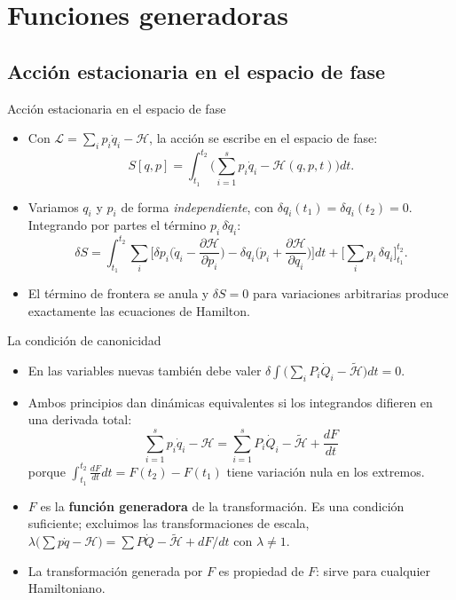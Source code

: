 \documentclass[spanish]{beamer}
\newcommand{\Lag}{\mathcal{L}}               %
\newcommand{\Ham}{\mathcal{H}}               %
\newcommand{\tH}{\tilde{\mathcal{H}}}        %
\newcommand{\pd}[2]{\frac{\partial #1}{\partial #2}}
\begin{document}
\section{Funciones generadoras}

\subsection{Acción estacionaria en el espacio de fase}
\begin{frame}{Acción estacionaria en el espacio de fase}
\begin{itemize}[<+->]
  \item Con $\Lag=\sum_i p_i\dot q_i-\Ham$, la acción se escribe en el espacio de fase:
        \[
          S[q,p]=\int_{t_1}^{t_2}\Big(\sum_{i=1}^s p_i\dot q_i-\Ham(q,p,t)\Big)dt .
        \]
  \item Variamos $q_i$ y $p_i$ de forma \emph{independiente}, con
        $\delta q_i(t_1)=\delta q_i(t_2)=0$. Integrando por partes el término
        $p_i\,\delta\dot q_i$:
        \[
          \delta S=\int_{t_1}^{t_2}\sum_i\Big[\delta p_i\Big(\dot q_i-\pd{\Ham}{p_i}\Big)
                  -\delta q_i\Big(\dot p_i+\pd{\Ham}{q_i}\Big)\Big]dt
                  +\Big[\sum_i p_i\,\delta q_i\Big]_{t_1}^{t_2}.
        \]
  \item El término de frontera se anula y $\delta S=0$ para variaciones arbitrarias
        produce exactamente las ecuaciones de Hamilton.
\end{itemize}
\end{frame}

\begin{frame}{La condición de canonicidad}
\begin{itemize}[<+->]
  \item En las variables nuevas también debe valer
        $\delta\int\big(\sum_i P_i\dot Q_i-\tH\big)dt=0$.
  \item Ambos principios dan dinámicas equivalentes si los integrandos difieren en una
        derivada total:
        \[
          \boxed{\;\sum_{i=1}^s p_i\dot q_i-\Ham=\sum_{i=1}^s P_i\dot Q_i-\tH+\frac{dF}{dt}\;}
        \]
        porque $\int_{t_1}^{t_2}\frac{dF}{dt}dt=F(t_2)-F(t_1)$ tiene variación nula
        en los extremos.
  \item $F$ es la \textbf{función generadora} de la transformación.
        Es una condición suficiente; excluimos las transformaciones de escala,
        $\lambda\big(\sum p\dot q-\Ham\big)=\sum P\dot Q-\tH+dF/dt$ con $\lambda\neq1$.
  \item La transformación generada por $F$ es propiedad de $F$: sirve para
        cualquier Hamiltoniano.
\end{itemize}
\end{frame}
\end{document}
